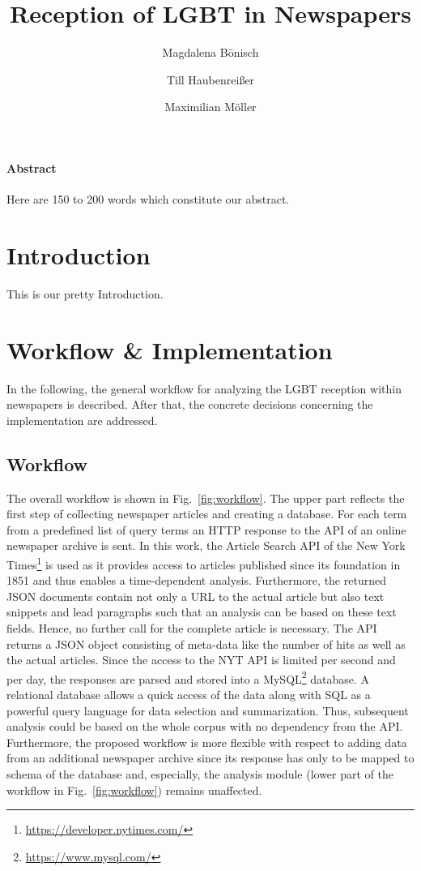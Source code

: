 \documentclass[10pt,a4paper,twocolumn]{scrartcl}
\title{Reception of LGBT in Newspapers}
\author{Magdalena Bönisch \and Till Haubenreißer \and Maximilian Möller}
\begin{document}
\onehalfspacing

\maketitle

{\footnotesize
\paragraph*{Abstract} Here are 150 to 200 words which constitute our abstract.
}


\section{Introduction}
This is our pretty Introduction.

\section{Workflow \& Implementation}
In the following, the general workflow for analyzing the LGBT reception within newspapers is described. After that, the concrete decisions concerning the implementation are addressed.

\subsection*{Workflow} The overall workflow is shown in Fig.~\ref{fig:workflow}. The upper part reflects the first step of collecting newspaper articles and creating a database. For each term from a predefined list of query terms an HTTP response to the API of an online newspaper archive is sent. In this work, the Article Search API of the New York Times\footnote{\url{https://developer.nytimes.com/}} is used as it provides access to articles published since its foundation in 1851 and thus enables a time-dependent analysis. Furthermore, the returned JSON documents contain not only a URL to the actual article but also text snippets and lead paragraphs such that an analysis can be based on these text fields. Hence, no further call for the complete article is necessary. The API returns a JSON object consisting of meta-data like the number of hits as well as the actual articles. Since the access to the NYT API is limited per second and per day, the responses are parsed and stored into a MySQL\footnote{\url{https://www.mysql.com/}} database. A relational database allows a quick access of the data along with SQL as a powerful query language for data selection and summarization. Thus, subsequent analysis could be based on the whole corpus with no dependency from the API. Furthermore, the proposed workflow is more flexible with respect to adding data from an additional newspaper archive since its response has only to be mapped to schema of the database and, especially, the analysis module (lower part of the workflow in Fig.~\ref{fig:workflow}) remains unaffected.
\end{document}
